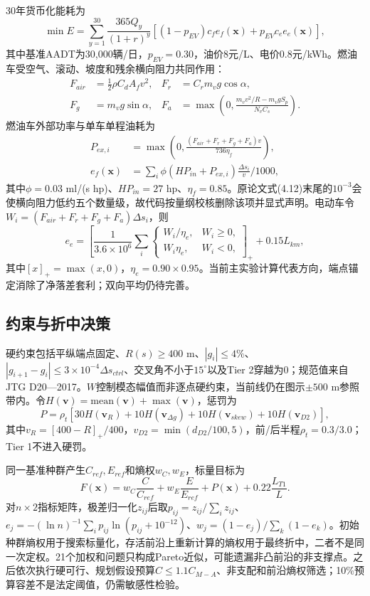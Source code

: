 \documentclass[preprint,12pt]{elsarticle}
\begin{document}
30年货币化能耗为
\begin{equation}
\min E=\sum_{y=1}^{30}\frac{365Q_y}{(1+r)^y}
\left[(1-p_{EV})c_fe_f(\bm x)+p_{EV}c_ee_e(\bm x)\right],
\end{equation}
其中基准AADT为30,000辆/日，$p_{EV}=0.30$，油价8元/L、电价0.8元/kWh。燃油车受空气、滚动、坡度和残余横向阻力共同作用：
\begin{align}
F_{air}&=\tfrac12\rho C_dA_fv^2, & F_r&=C_rm_vg\cos\alpha,\\
F_g&=m_vg\sin\alpha, &
F_a&=\max\left(0,\frac{m_vv^2/R-m_vgS_p}{N_vC_s}\right).
\end{align}
燃油车外部功率与单车单程油耗为
\begin{align}
P_{ex,i}&=\max\left(0,\frac{(F_{air}+F_r+F_g+F_a)v}{736\eta_f}\right),\\
e_f(\bm x)&=\sum_i\phi(HP_{in}+P_{ex,i})\frac{\Delta s_i}{v}/1000,
\end{align}
其中$\phi=0.03$ ml/(s hp)、$HP_{in}=27$ hp、$\eta_f=0.85$。原论文式(4.12)末尾的$10^{-3}$会使横向阻力低约五个数量级，故代码按量纲校核删除该项并显式声明。电动车令$W_i=(F_{air}+F_r+F_g+F_a)\Delta s_i$，则
\begin{equation}
e_e=\left[\frac{1}{3.6\times10^6}\sum_i
\begin{cases}W_i/\eta_e,&W_i\geq0,\\W_i\eta_e,&W_i<0,\end{cases}
\right]_+ +0.15L_{km},
\end{equation}
其中$[x]_+=\max(x,0)$，$\eta_e=0.90\times0.95$。当前主实验计算代表方向，端点锚定消除了净落差套利；双向平均仍待完善。

\subsection{约束与折中决策}

硬约束包括平纵端点固定、$R(s)\geq400$ m、$|g_i|\leq4\%$、$|g_{i+1}-g_i|\leq3\times10^{-4}\Delta s_{ctrl}$、交叉角不小于$15^\circ$以及Tier 2穿越为0；规范值来自JTG D20—2017\cite{jtgd20}。$W$控制模态幅值而非逐点硬约束，当前线仍在图示$\pm500$ m参照带内。令$H(\bm v)=\mathrm{mean}(\bm v)+\max(\bm v)$，惩罚为
\begin{equation}
P=\rho_t[30H(\bm v_R)+10H(\bm v_{\Delta g})+10H(\bm v_{skew})+10H(\bm v_{D2})],
\end{equation}
其中$v_R=[400-R]_+/400$，$v_{D2}=\min(d_{D2}/100,5)$，前/后半程$\rho_t=0.3/3.0$；Tier 1不进入硬罚。

同一基准种群产生$C_{ref},E_{ref}$和熵权$w_C,w_E$，标量目标为
\begin{equation}
F(\bm x)=w_C\frac{C}{C_{ref}}+w_E\frac{E}{E_{ref}}+P(\bm x)
+0.22\frac{L_{T1}}{L}.
\end{equation}
对$n\times2$指标矩阵，极差归一化$z_{ij}$后取$p_{ij}=z_{ij}/\sum_i z_{ij}$、$e_j=-(\ln n)^{-1}\sum_i p_{ij}\ln(p_{ij}+10^{-12})$、$w_j=(1-e_j)/\sum_k(1-e_k)$。初始种群熵权用于搜索标量化，存活前沿上重新计算的熵权用于最终折中，二者不是同一次定权。21个加权和问题只构成Pareto近似，可能遗漏非凸前沿的非支撑点。之后依次执行硬可行、规划假设预算$C\leq1.1C_{M-A}$、非支配和前沿熵权筛选；10\%预算容差不是法定阈值，仍需敏感性检验。
\end{document}
